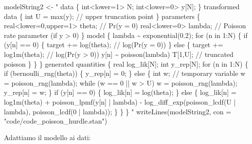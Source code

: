 \documentclass[
  10pt,
  italian,
  a4paper,
  extrafontsizes,onecolumn,openright
  ]{memoir}
\newenvironment{Shaded}{\begin{snugshade}}{\end{snugshade}}
\newcommand{\AttributeTok}[1]{\textcolor[rgb]{0.77,0.63,0.00}{#1}}
\newcommand{\FunctionTok}[1]{\textcolor[rgb]{0.00,0.00,0.00}{#1}}
\newcommand{\NormalTok}[1]{#1}
\newcommand{\OtherTok}[1]{\textcolor[rgb]{0.56,0.35,0.01}{#1}}
\newcommand{\StringTok}[1]{\textcolor[rgb]{0.31,0.60,0.02}{#1}}
\begin{document}
\begin{Shaded}
\begin{Highlighting}[]
\NormalTok{modelString2 }\OtherTok{\textless{}{-}} \StringTok{"}
\StringTok{data \{}
\StringTok{  int\textless{}lower=1\textgreater{} N;}
\StringTok{  int\textless{}lower=0\textgreater{} y[N];}
\StringTok{\}}
\StringTok{transformed data \{}
\StringTok{  int U = max(y);  // upper truncation point}
\StringTok{\}}
\StringTok{parameters \{}
\StringTok{  real\textless{}lower=0,upper=1\textgreater{} theta; // Pr(y = 0)}
\StringTok{  real\textless{}lower=0\textgreater{} lambda; // Poisson rate parameter (if y \textgreater{} 0)}
\StringTok{\}}
\StringTok{model \{}
\StringTok{  lambda \textasciitilde{} exponential(0.2);}
\StringTok{  }
\StringTok{  for (n in 1:N) \{}
\StringTok{    if (y[n] == 0) \{}
\StringTok{      target += log(theta);  // log(Pr(y = 0))}
\StringTok{    \} else \{}
\StringTok{      target += log1m(theta);  // log(Pr(y \textgreater{} 0))}
\StringTok{      y[n] \textasciitilde{} poisson(lambda) T[1,U];  // truncated poisson}
\StringTok{    \}}
\StringTok{  \}}
\StringTok{\}}
\StringTok{generated quantities \{}
\StringTok{  real log\_lik[N];}
\StringTok{  int y\_rep[N];}
\StringTok{  for (n in 1:N) \{}
\StringTok{    if (bernoulli\_rng(theta)) \{}
\StringTok{      y\_rep[n] = 0;}
\StringTok{    \} else \{}
\StringTok{      int w;  // temporary variable}
\StringTok{      w = poisson\_rng(lambda); }
\StringTok{      while (w == 0 || w \textgreater{} U)}
\StringTok{        w = poisson\_rng(lambda);}
\StringTok{        }
\StringTok{      y\_rep[n] = w;}
\StringTok{    \}}
\StringTok{    if (y[n] == 0) \{}
\StringTok{      log\_lik[n] = log(theta);}
\StringTok{    \} else \{}
\StringTok{      log\_lik[n] = log1m(theta)}
\StringTok{    + poisson\_lpmf(y[n] | lambda)}
\StringTok{    {-} log\_diff\_exp(poisson\_lcdf(U | lambda),}
\StringTok{                       poisson\_lcdf(0 | lambda));}
\StringTok{    \}}
\StringTok{  \}}
\StringTok{\}}
\StringTok{"}
\FunctionTok{writeLines}\NormalTok{(modelString2, }\AttributeTok{con =} \StringTok{"code/code\_poisson\_hurdle.stan"}\NormalTok{)}
\end{Highlighting}
\end{Shaded}

\noindent
Adattiamo il modello ai dati:
\end{document}
